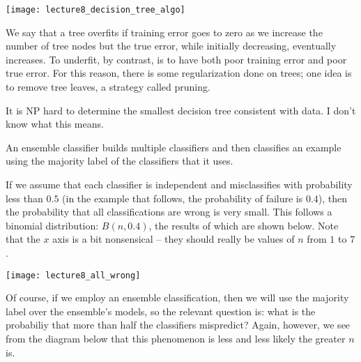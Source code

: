 \documentclass[../main.tex]{subfiles}
\begin{document}
    \begin{center}
        \texttt{[image: lecture8\_decision\_tree\_algo]}
    \end{center}

    \begin{remark}
        We say that a tree overfits if training error goes to zero as we increase the
        number of tree nodes but the true error, while initially decreasing, eventually
        increases. To underfit, by contrast, is to have both poor training error and poor
        true error. For this reason, there is some regularization done on trees; one
        idea is to remove tree leaves, a strategy called pruning.
    \end{remark}

    \begin{unresolved}
        It is NP hard to determine the smallest decision tree consistent with data.
        I don't know what this means.
    \end{unresolved}

    \begin{definition}
        An ensemble classifier builds multiple classifiers and then classifies an
        example using the majority label of the classifiers that it uses.
    \end{definition}

    \begin{remark}
        If we assume that each classifier is independent and misclassifies with probability
        less than $0.5$ (in the example that follows, the probability of failure is $0.4$),
        then the probability that all classifications are wrong is very small. This follows
        a binomial distribution: $B(n,0.4)$, the results of which are shown below. Note that
        the $x$ axis is a bit nonsensical -- they should really be values of $n$ from $1$
        to $7$.
    \end{remark}

    \begin{center}
        \texttt{[image: lecture8\_all\_wrong]}
    \end{center}

    \begin{remark}
        Of course, if we employ an ensemble classification, then we will use the majority
        label over the ensemble's models, so the relevant question is: what is the
        probabiliy that more than half the classifiers mispredict? Again, however,
        we see from the diagram below that this phenomenon is less and less likely
        the greater $n$ is.
    \end{remark}
\end{document}
